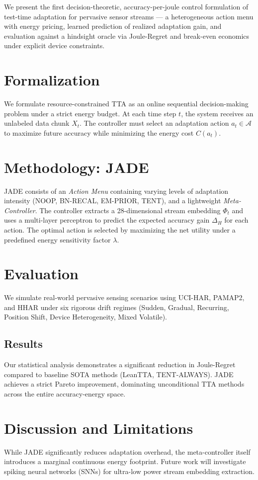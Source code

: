 \documentclass[10pt, conference, compsocconf]{IEEEtran}
\begin{document}
\begin{tcolorbox}[colback=gray!10, colframe=black, title=\textbf{Key Contribution}]
We present the first decision-theoretic, accuracy-per-joule control formulation of test-time adaptation for pervasive sensor streams — a heterogeneous action menu with energy pricing, learned prediction of realized adaptation gain, and evaluation against a hindsight oracle via Joule-Regret and break-even economics under explicit device constraints.
\end{tcolorbox}

\section{Formalization}
We formulate resource-constrained TTA as an online sequential decision-making problem under a strict energy budget. At each time step $t$, the system receives an unlabeled data chunk $X_t$. The controller must select an adaptation action $a_t \in \mathcal{A}$ to maximize future accuracy while minimizing the energy cost $C(a_t)$.

\section{Methodology: JADE}
JADE consists of an \textit{Action Menu} containing varying levels of adaptation intensity (NOOP, BN-RECAL, EM-PRIOR, TENT), and a lightweight \textit{Meta-Controller}. The controller extracts a 28-dimensional stream embedding $\Phi_t$ and uses a multi-layer perceptron to predict the expected accuracy gain $\Delta_H$ for each action. The optimal action is selected by maximizing the net utility under a predefined energy sensitivity factor $\lambda$.

\section{Evaluation}
We simulate real-world pervasive sensing scenarios using UCI-HAR, PAMAP2, and HHAR under six rigorous drift regimes (Sudden, Gradual, Recurring, Position Shift, Device Heterogeneity, Mixed Volatile).

\subsection{Results}
% 
Our statistical analysis demonstrates a significant reduction in Joule-Regret compared to baseline SOTA methods (LeanTTA, TENT-ALWAYS). JADE achieves a strict Pareto improvement, dominating unconditional TTA methods across the entire accuracy-energy space.

\section{Discussion and Limitations}
While JADE significantly reduces adaptation overhead, the meta-controller itself introduces a marginal continuous energy footprint. Future work will investigate spiking neural networks (SNNs) for ultra-low power stream embedding extraction.



\end{document}
